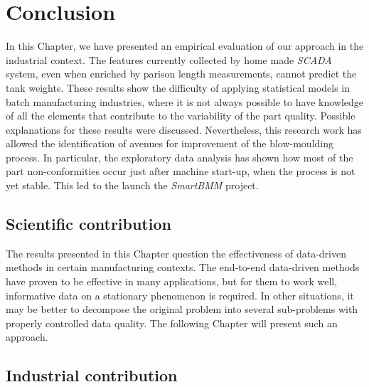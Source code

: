 \section{Conclusion}

In this Chapter, we have presented an empirical evaluation of our approach in the industrial context. The features currently collected by home made \textit{SCADA} system, even when enriched by parison length measurements, cannot predict the tank weights. These results show the difficulty of applying statistical models in batch manufacturing industries, where it is not always possible to have knowledge of all the elements that contribute to the variability of the part quality. Possible explanations for these results were discussed. Nevertheless, this research work has allowed the identification of avenues for improvement of the blow-moulding process. In particular, the exploratory data analysis has shown how most of the part non-conformities occur just after machine start-up, when the process is not yet stable. This led to the launch the \textit{SmartBMM} project.

\subsection{Scientific contribution}

The results presented in this Chapter question the effectiveness of data-driven methods in certain manufacturing contexts. The end-to-end data-driven methods have proven to be effective in many applications, but for them to work well, informative data on a stationary phenomenon is required. In other situations, it may be better to decompose the original problem into several sub-problems with properly controlled data quality. The following Chapter will present such an approach.

\subsection{Industrial contribution}

